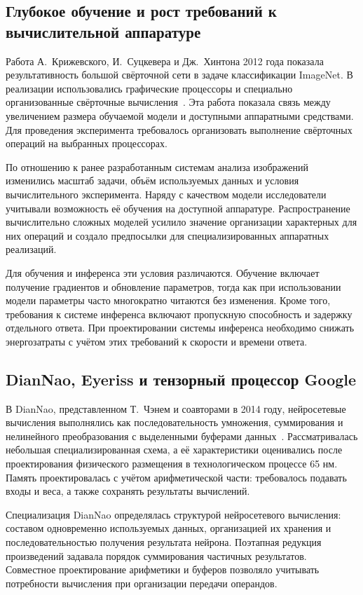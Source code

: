 \subsection{Глубокое обучение и рост требований к вычислительной аппаратуре}

Работа А.~Крижевского, И.~Суцкевера и Дж.~Хинтона 2012 года показала
результативность большой свёрточной сети в задаче классификации
ImageNet. В реализации использовались графические процессоры
и специально организованные свёрточные вычисления~\cite{krizhevsky2012}.
Эта работа показала связь между увеличением размера обучаемой модели и
доступными аппаратными средствами. Для проведения эксперимента требовалось
организовать выполнение свёрточных операций на выбранных процессорах.

По отношению к ранее разработанным системам анализа изображений
изменились масштаб задачи, объём используемых данных и условия
вычислительного эксперимента. Наряду с качеством модели исследователи учитывали возможность её обучения на
доступной аппаратуре.
Распространение вычислительно сложных моделей усилило значение
организации характерных для них операций и создало предпосылки
для специализированных аппаратных реализаций.

Для обучения и инференса эти условия различаются. Обучение включает
получение градиентов и обновление параметров, тогда как при использовании
модели параметры часто многократно читаются без изменения. Кроме того,
требования к системе инференса включают пропускную способность
и задержку отдельного ответа. При проектировании системы инференса необходимо снижать энергозатраты с учётом
этих требований к скорости и времени ответа.

\subsection{DianNao, Eyeriss и тензорный процессор Google}

В DianNao, представленном Т.~Чэнем и соавторами в 2014 году,
нейросетевые вычисления выполнялись как последовательность
умножения, суммирования и нелинейного преобразования с выделенными
буферами данных~\cite{chen2014}. Рассматривалась небольшая
специализированная схема, а её характеристики оценивались после
проектирования физического размещения в технологическом процессе 65 нм.
Память проектировалась с учётом арифметической части: требовалось подавать
входы и веса, а также сохранять результаты вычислений.

Специализация DianNao определялась структурой нейросетевого
вычисления: составом одновременно используемых данных, организацией
их хранения и последовательностью получения результата нейрона.
Поэтапная редукция произведений задавала порядок суммирования
частичных результатов. Совместное проектирование арифметики
и буферов позволяло учитывать потребности вычисления
при организации передачи операндов.

